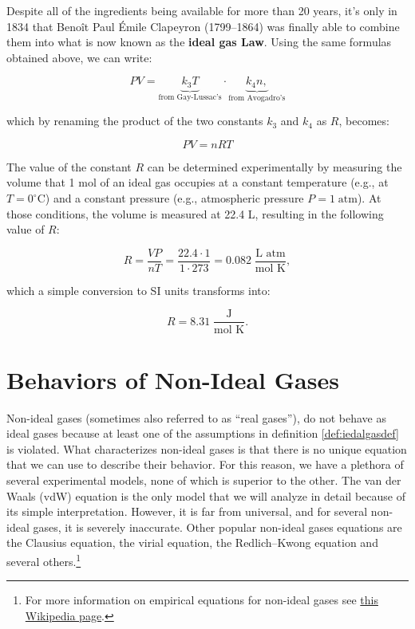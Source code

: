 \documentclass[
  9pt,
]{extbook}
\theoremstyle{definition}
\theoremstyle{definition}
\theoremstyle{definition}
\theoremstyle{remark}
\begin{document}
Despite all of the ingredients being available for more than 20 years, it's only in 1834 that Benoît Paul Émile Clapeyron (1799--1864) was finally able to combine them into what is now known as the \textbf{ideal gas Law}. Using the same formulas obtained above, we can write:

\begin{equation}
PV=\underbrace{k_3 T}_{\text{from Gay-Lussac's}} \cdot \underbrace{k_4 n,}_{\text{from Avogadro's}}
\label{eq:ideallaw1}
\end{equation}

which by renaming the product of the two constants \(k_3\) and \(k_4\) as \(R\), becomes:

\begin{equation}
PV=nRT
\label{eq:ideallaw2}
\end{equation}

The value of the constant \(R\) can be determined experimentally by measuring the volume that 1 mol of an ideal gas occupies at a constant temperature (e.g., at \(T=0^\circ\mathrm{C}\)) and a constant pressure (e.g., atmospheric pressure \(P=1\;\mathrm{atm}\)). At those conditions, the volume is measured at 22.4 L, resulting in the following value of \(R\):

\begin{equation}
R=\frac{VP}{nT}=\frac{22.4 \cdot 1}{1 \cdot 273}=0.082 \;\frac{\text{L atm}}{\text{mol K}},
\label{eq:ideallaw3}
\end{equation}

which a simple conversion to SI units transforms into:

\begin{equation}
R=8.31\;\frac{\text{J}}{\text{mol K}}.
\label{eq:RvalueSI}
\end{equation}

\hypertarget{behaviors-of-non-ideal-gases}{%
\section{Behaviors of Non-Ideal Gases}\label{behaviors-of-non-ideal-gases}}

Non-ideal gases (sometimes also referred to as ``real gases''), do not behave as ideal gases because at least one of the assumptions in definition \ref{def:iedalgasdef} is violated. What characterizes non-ideal gases is that there is no unique equation that we can use to describe their behavior. For this reason, we have a plethora of several experimental models, none of which is superior to the other. The van der Waals (vdW) equation is the only model that we will analyze in detail because of its simple interpretation. However, it is far from universal, and for several non-ideal gases, it is severely inaccurate. Other popular non-ideal gases equations are the Clausius equation, the virial equation, the Redlich--Kwong equation and several others.\footnote{For more information on empirical equations for non-ideal gases see \href{https://en.wikipedia.org/wiki/Real_gas}{this Wikipedia page}.}
\end{document}
